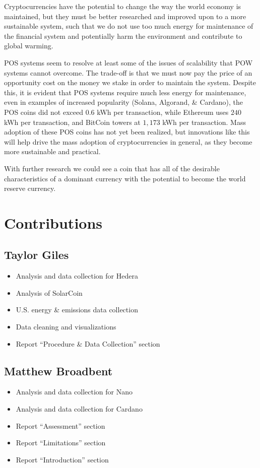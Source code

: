 \documentclass{article}
\begin{document}
Cryptocurrencies have the potential to change the way the world economy is maintained, but they must be better researched and improved upon to a more sustainable system, such that we do not use too much energy for maintenance of the financial system and potentially harm the environment and contribute to global warming. 

POS systems seem to resolve at least some of the issues of scalability that POW systems cannot overcome. The trade-off is that we must now pay the price of an opportunity cost on the money we stake in order to maintain the system. Despite this, it is evident that POS systems require much less energy for maintenance, even in examples of increased popularity (Solana, Algorand, & Cardano), the POS coins did not exceed $0.6$ kWh per transaction, while Ethereum uses $240$ kWh per transaction, and BitCoin towers at $1,173$ kWh per transaction. Mass adoption of these POS coins has not yet been realized, but innovations like this will help drive the mass adoption of cryptocurrencies in general, as they become more sustainable and practical.

With further research we could see a coin that has all of the desirable characteristics of a dominant currency with the potential to become the world reserve currency.

\pagebreak
\section{Contributions}
\subsection{Taylor Giles}
\begin{itemize}
    \item Analysis and data collection for Hedera
    \item Analysis of SolarCoin
    \item U.S. energy \& emissions data collection
    \item Data cleaning and visualizations
    \item Report ``Procedure \& Data Collection'' section
\end{itemize}

\subsection{Matthew Broadbent}
\begin{itemize}
    \item Analysis and data collection for Nano
    \item Analysis and data collection for Cardano
    \item Report ``Assessment'' section
    \item Report ``Limitations'' section
    \item Report ``Introduction'' section
\end{itemize}
\end{document}
